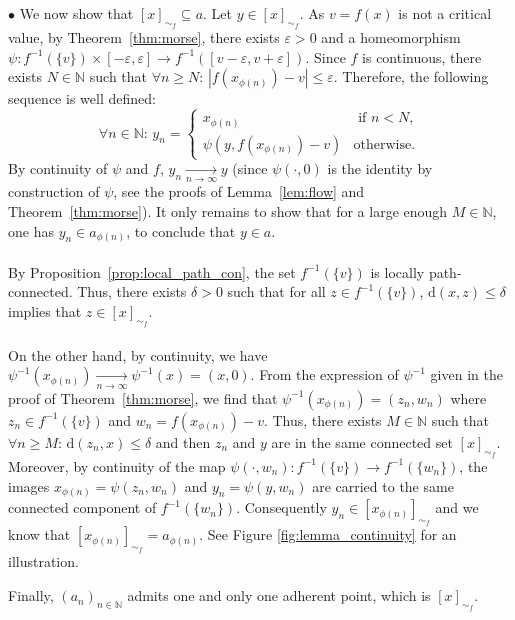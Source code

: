 \documentclass[pdflatex,sn-mathphys-ay]{sn-jnl}%
\newcommand{\dis}{\mathrm{d}}
\newcommand{\converge}{\underset{n\rightarrow\infty}{\longrightarrow}}
\newcommand{\N}{\mathbb{N}}
\newcommand{\eps}{\varepsilon}
\newcommand{\preim}[2]{#1^{-1}(#2)}
\newcommand{\change}[1]{\noindent #1}
\theoremstyle{thmstyleone}%
\begin{document}
\begin{appendices}
$\bullet$ We now show that $[x]_{\sim_f}\subseteq a$. Let $y\in[x]_{\sim_f}$. As $v=f(x)$ is not a critical value, by Theorem~\ref{thm:morse}, there exists $\eps>0$ and a homeomorphism $\psi:\preim{f}{\{v\}}\times[-\eps,\eps] \rightarrow \preim{f}{[v-\eps,v+\eps]}$. 
Since $f$ is continuous, there exists $N\in\N$ such that $\forall n\geq N$: $|f(x_{\phi(n)})-v|\leq \eps$. Therefore, the following sequence is well defined:
$$\forall n\in\mathbb{N}:\,y_n=\begin{cases}
    x_{\phi(n)}&\text{ if } n<N,\\
    \psi\left(y,f(x_{\phi(n)})-v\right)&\text{otherwise}.
\end{cases}$$
By continuity of $\psi$ and $f$, $y_n\converge y$ (since $\psi(\cdot,0)$ is the identity by construction of $\psi$, see the proofs of Lemma~\ref{lem:flow} and Theorem~\ref{thm:morse}). It only remains to show that for a large enough $M\in\N$, one has $y_n\in a_{\phi(n)}$,
to conclude that $y\in a$.\\\\
\change{By Proposition~\ref{prop:local_path_con}, }the set $\preim{f}{\{v\}}$ is locally path-connected. Thus, there exists $\delta>0$ such that for all  $z\in \preim{f}{\{v\}}$, $\dis(x,z)\leq\delta$ implies that $z\in[x]_{\sim_f}$.\\\\
On the other hand, by continuity, we have $\preim{\psi}{x_{\phi(n)}}\converge \preim{\psi}{x}=(x,0)$. From the expression of $\psi^{-1}$ given in the proof of Theorem~\ref{thm:morse}, we find that   $\preim{\psi}{x_{\phi(n)}}=\left(z_n,w_n\right)$ where $z_n \in \preim{f}{\{v\}}$ and  $w_n=f(x_{\phi(n)})-v$. Thus, there exists $M\in\N$ such that $\forall n\geq M$: $\dis(z_n,x)\leq\delta$ and then 
 $z_n$ and $y$ are in the same connected set $[x]_{\sim_f}$. Moreover, by continuity of the map $\psi\left(\cdot,w_n\right) : \preim{f}{\{v\}} \rightarrow  \preim{f}{\{w_n\}}$, the images  $x_{\phi(n)} = \psi\left(z_n,w_n\right)$ and $y_n = \psi\left(y,w_n\right)$  are carried to the same connected component of $\preim{f}{\{w_n\}}$. Consequently $y_n\in[x_{\phi(n)}]_{\sim_f}$ and we know that $[x_{\phi(n)}]_{\sim_f}=a_{\phi(n)}$. See Figure \ref{fig:lemma_continuity} for an illustration.

Finally, $(a_n)_{n\in\N}$ admits one and only one adherent point, which is $[x]_{\sim_f}$.


\end{appendices}
\end{document}
